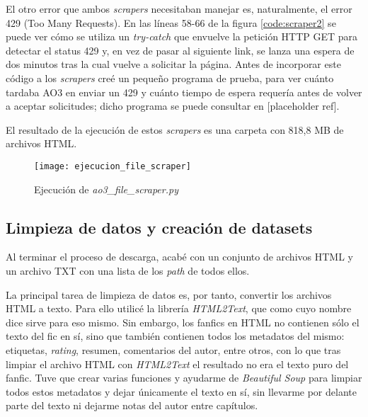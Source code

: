 \documentclass{pre-tfg}
\newcommand{\refToTrialCode}{[placeholder ref]}
\begin{document}
El otro error que ambos \textit{scrapers} necesitaban manejar es, naturalmente, el error 429 (Too Many Requests). En las líneas 58-66 de la figura \ref{code:scraper2} se puede ver cómo se utiliza un \textit{try-catch} que envuelve la petición HTTP GET para detectar el status 429 y, en vez de pasar al siguiente link, se lanza una espera de dos minutos tras la cual vuelve a solicitar la página. Antes de incorporar este código a los \textit{scrapers} creé un pequeño programa de prueba, para ver cuánto tardaba AO3 en enviar un 429 y cuánto tiempo de espera requería antes de volver a aceptar solicitudes; dicho programa se puede consultar en \refToTrialCode.
 

El resultado de la ejecución de estos \textit{scrapers} es una carpeta con 818,8 MB de archivos HTML.

\begin{figure}[h]
	\centering
	\texttt{[image: ejecucion\_file\_scraper]}
	\label{fig:file_scraper}
	\caption{Ejecución de \textit{ao3\_file\_scraper.py}}
\end{figure}


\subsection{Limpieza de datos y creación de datasets}
\label{sec:limpiezadatos}

Al terminar el proceso de descarga, acabé con un conjunto de archivos HTML y un archivo TXT con una lista de los \textit{path} de todos ellos.

La principal tarea de limpieza de datos es, por tanto, convertir los archivos HTML a texto. Para ello utilicé la librería \textit{HTML2Text}, que como cuyo nombre dice sirve para eso mismo. Sin embargo, los fanfics en HTML no contienen sólo el texto del fic en sí, sino que también contienen todos los metadatos del mismo: etiquetas, \textit{rating}, resumen, comentarios del autor, entre otros, con lo que tras limpiar el archivo HTML con \textit{HTML2Text} el resultado no era el texto puro del fanfic. Tuve que crear varias funciones y ayudarme de \textit{Beautiful Soup} para limpiar todos estos metadatos y dejar únicamente el texto en sí, sin llevarme por delante parte del texto ni dejarme notas del autor entre capítulos.
\end{document}

